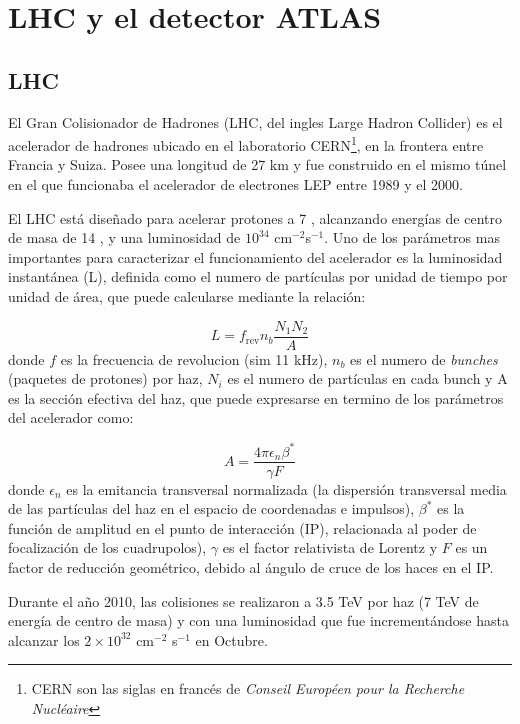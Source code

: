 \chapter{LHC y el detector ATLAS}

\section{LHC}

El Gran Colisionador de Hadrones (LHC, del ingles Large Hadron Collider) es el
acelerador de hadrones ubicado en el laboratorio CERN\footnote{CERN son las
  siglas en francés de \emph{Conseil Européen pour la Recherche Nucléaire}}, en
la frontera entre Francia y Suiza. Posee una longitud de 27 km y fue construido
en el mismo túnel en el que funcionaba el acelerador de electrones LEP entre
1989 y el 2000.

El LHC está diseñado para acelerar protones a 7 \tev, alcanzando energías de
centro de masa de 14 \tev, y una luminosidad de $10^{34}$ cm$^{-2}$s$^{-1}$. Uno
de los parámetros mas importantes para caracterizar el funcionamiento del
acelerador es la luminosidad instantánea (L), definida como el numero de
partículas por unidad de tiempo por unidad de área, que puede calcularse
mediante la relación:

\begin{equation}
  L = f_\text{rev} n_b \frac{N_1 N_2}{A}
\end{equation}
%
donde $f$ es la frecuencia de revolucion (sim 11 kHz), $n_b$ es el numero de
\emph{bunches} (paquetes de protones) por haz, $N_i$ es el numero de partículas
en cada bunch y A es la sección efectiva del haz, que puede expresarse en
termino de los parámetros del acelerador como:

\begin{equation}
  A = \frac{4\pi \epsilon_n \beta^{*}}{\gamma F}
\end{equation}
%
donde $\epsilon_n$ es la emitancia transversal normalizada (la dispersión
transversal media de las partículas del haz en el espacio de coordenadas e
impulsos), $\beta^{*}$ es la función de amplitud en el punto de interacción
(IP), relacionada al poder de focalización de los cuadrupolos), $\gamma$ es el
factor relativista de Lorentz y $F$ es un factor de reducción geométrico, debido
al ángulo de cruce de los haces en el IP.


Durante el año 2010, las colisiones se realizaron a 3.5 TeV por haz (7 TeV de
energía de centro de masa) y con una luminosidad que fue incrementándose hasta
alcanzar los $2 \times 10^{32}$ cm$^{-2}$ s$^{-1}$ en Octubre. %

